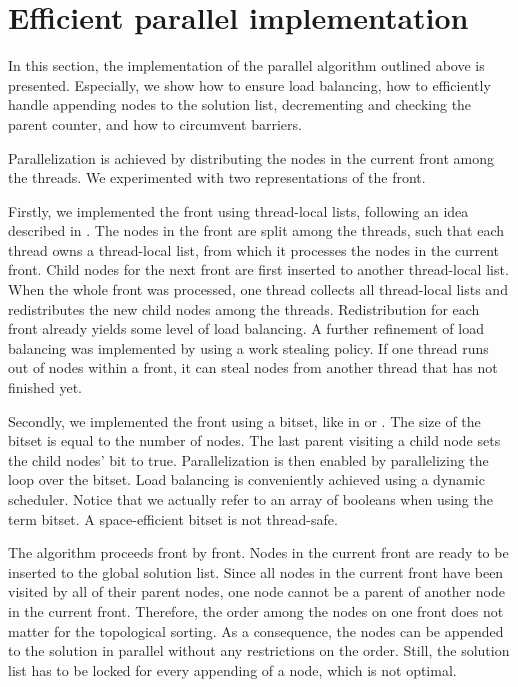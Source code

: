 
\section{Efficient parallel implementation}\label{sec:yourmethod}

In this section, the implementation of the parallel algorithm outlined above is presented.
Especially, we show how to ensure load balancing, how to efficiently handle appending nodes to the solution list, decrementing and checking the parent counter, and how to circumvent barriers.

Parallelization is achieved by distributing the nodes in the current front among the threads. We experimented with two representations of the front.

Firstly, we implemented the front using thread-local lists, following an idea described in \cite{bulucc2011parallel}.
The nodes in the front are split among the threads, such that each thread owns a thread-local list, from which it processes the nodes in the current front.
Child nodes for the next front are first inserted to another thread-local list.
When the whole front was processed, one thread collects all thread-local lists and redistributes the new child nodes among the threads.
Redistribution for each front already yields some level of load balancing.
A further refinement of load balancing was implemented by using a work stealing policy.
If one thread runs out of nodes within a front, it can steal nodes from another thread that has not finished yet.

Secondly, we implemented the front using a bitset, like in \cite{agarwal2010scalable} or \cite{beamer2013direction}. The size of the bitset is equal to the number of nodes.
The last parent visiting a child node sets the child nodes' bit to true. Parallelization is then enabled by parallelizing the loop over the bitset.
Load balancing is conveniently achieved using a dynamic scheduler.
Notice that we actually refer to an array of booleans when using the term bitset. A space-efficient bitset is not thread-safe.


The algorithm proceeds front by front.
Nodes in the current front are ready to be inserted to the global solution list.
Since all nodes in the current front have been visited by all of their parent nodes, one node cannot be a parent of another node in the current front.
Therefore, the order among the nodes on one front does not matter for the topological sorting.
As a consequence, the nodes can be appended to the solution in parallel without any restrictions on the order.
Still, the solution list has to be locked for every appending of a node, which is not optimal.

